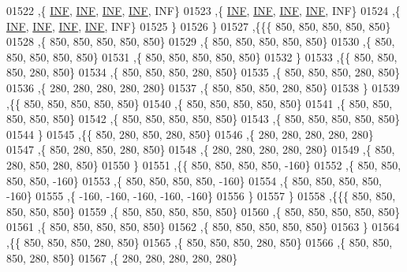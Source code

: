 \begin{DoxyCode}
01522    ,\{   \hyperlink{constants_8h_a12c2040f25d8e3a7b9e1c2024c618cb6}{INF},   \hyperlink{constants_8h_a12c2040f25d8e3a7b9e1c2024c618cb6}{INF},   \hyperlink{constants_8h_a12c2040f25d8e3a7b9e1c2024c618cb6}{INF},   \hyperlink{constants_8h_a12c2040f25d8e3a7b9e1c2024c618cb6}{INF},   INF\}
01523    ,\{   \hyperlink{constants_8h_a12c2040f25d8e3a7b9e1c2024c618cb6}{INF},   \hyperlink{constants_8h_a12c2040f25d8e3a7b9e1c2024c618cb6}{INF},   \hyperlink{constants_8h_a12c2040f25d8e3a7b9e1c2024c618cb6}{INF},   \hyperlink{constants_8h_a12c2040f25d8e3a7b9e1c2024c618cb6}{INF},   INF\}
01524    ,\{   \hyperlink{constants_8h_a12c2040f25d8e3a7b9e1c2024c618cb6}{INF},   \hyperlink{constants_8h_a12c2040f25d8e3a7b9e1c2024c618cb6}{INF},   \hyperlink{constants_8h_a12c2040f25d8e3a7b9e1c2024c618cb6}{INF},   \hyperlink{constants_8h_a12c2040f25d8e3a7b9e1c2024c618cb6}{INF},   INF\}
01525    \}
01526   \}
01527  ,\{\{\{   850,   850,   850,   850,   850\}
01528    ,\{   850,   850,   850,   850,   850\}
01529    ,\{   850,   850,   850,   850,   850\}
01530    ,\{   850,   850,   850,   850,   850\}
01531    ,\{   850,   850,   850,   850,   850\}
01532    \}
01533   ,\{\{   850,   850,   850,   280,   850\}
01534    ,\{   850,   850,   850,   280,   850\}
01535    ,\{   850,   850,   850,   280,   850\}
01536    ,\{   280,   280,   280,   280,   280\}
01537    ,\{   850,   850,   850,   280,   850\}
01538    \}
01539   ,\{\{   850,   850,   850,   850,   850\}
01540    ,\{   850,   850,   850,   850,   850\}
01541    ,\{   850,   850,   850,   850,   850\}
01542    ,\{   850,   850,   850,   850,   850\}
01543    ,\{   850,   850,   850,   850,   850\}
01544    \}
01545   ,\{\{   850,   280,   850,   280,   850\}
01546    ,\{   280,   280,   280,   280,   280\}
01547    ,\{   850,   280,   850,   280,   850\}
01548    ,\{   280,   280,   280,   280,   280\}
01549    ,\{   850,   280,   850,   280,   850\}
01550    \}
01551   ,\{\{   850,   850,   850,   850,  -160\}
01552    ,\{   850,   850,   850,   850,  -160\}
01553    ,\{   850,   850,   850,   850,  -160\}
01554    ,\{   850,   850,   850,   850,  -160\}
01555    ,\{  -160,  -160,  -160,  -160,  -160\}
01556    \}
01557   \}
01558  ,\{\{\{   850,   850,   850,   850,   850\}
01559    ,\{   850,   850,   850,   850,   850\}
01560    ,\{   850,   850,   850,   850,   850\}
01561    ,\{   850,   850,   850,   850,   850\}
01562    ,\{   850,   850,   850,   850,   850\}
01563    \}
01564   ,\{\{   850,   850,   850,   280,   850\}
01565    ,\{   850,   850,   850,   280,   850\}
01566    ,\{   850,   850,   850,   280,   850\}
01567    ,\{   280,   280,   280,   280,   280\}

\end{DoxyCode}
